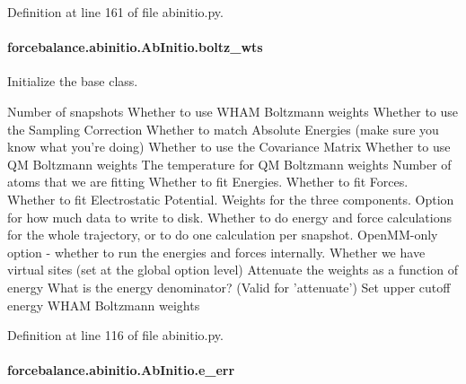 Definition at line 161 of file abinitio.\-py.

\hypertarget{classforcebalance_1_1abinitio_1_1AbInitio_ac442f096d11d0294235f2c8cbe1dcbb4}{
\paragraph[{boltz\-\_\-wts}]{\setlength{\rightskip}{0pt plus 5cm}forcebalance.\-abinitio.\-Ab\-Initio.\-boltz\-\_\-wts}}\label{classforcebalance_1_1abinitio_1_1AbInitio_ac442f096d11d0294235f2c8cbe1dcbb4}


Initialize the base class. 

Number of snapshots Whether to use W\-H\-A\-M Boltzmann weights Whether to use the Sampling Correction Whether to match Absolute Energies (make sure you know what you're doing) Whether to use the Covariance Matrix Whether to use Q\-M Boltzmann weights The temperature for Q\-M Boltzmann weights Number of atoms that we are fitting Whether to fit Energies. Whether to fit Forces. Whether to fit Electrostatic Potential. Weights for the three components. Option for how much data to write to disk. Whether to do energy and force calculations for the whole trajectory, or to do one calculation per snapshot. Open\-M\-M-\/only option -\/ whether to run the energies and forces internally. Whether we have virtual sites (set at the global option level) Attenuate the weights as a function of energy What is the energy denominator? (Valid for 'attenuate') Set upper cutoff energy W\-H\-A\-M Boltzmann weights 

Definition at line 116 of file abinitio.\-py.

\hypertarget{classforcebalance_1_1abinitio_1_1AbInitio_aa569290969858e189935b3de37ead3f0}{
\paragraph[{e\-\_\-err}]{\setlength{\rightskip}{0pt plus 5cm}forcebalance.\-abinitio.\-Ab\-Initio.\-e\-\_\-err}}\label{classforcebalance_1_1abinitio_1_1AbInitio_aa569290969858e189935b3de37ead3f0}


